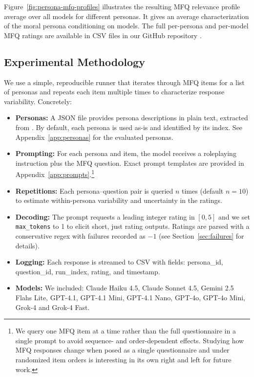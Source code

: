 \documentclass{article}
\begin{document}
Figure~\ref{fig:persona-mfq-profiles} illustrates the resulting MFQ relevance profile average over all models for different personas. It gives an average characterization of the moral persona conditioning on models. The full per-persona and per-model MFQ ratings are available in CSV files in our GitHub repository \cite{costa2025llmms}. 

\subsection{Experimental Methodology}
We use a simple, reproducible runner that iterates through MFQ items for a list of personas and repeats each item multiple times to characterize response variability. Concretely:
\begin{itemize}
  \item \textbf{Personas:} A JSON file provides persona descriptions in plain text, extracted from \citep{ge2025scalingsyntheticdatacreation}. By default, each persona is used as-is and identified by its index. See Appendix~\ref{app:personas} for the evaluated personas.
  \item \textbf{Prompting:} For each persona and item, the model receives a roleplaying instruction plus the MFQ question. Exact prompt templates are provided in Appendix~\ref{app:prompts}.\footnote{We query one MFQ item at a time rather than the full questionnaire in a single prompt to avoid sequence- and order-dependent effects. Studying how MFQ responses change when posed as a single questionnaire and under randomized item orders is interesting in its own right and left for future work.}
  \item \textbf{Repetitions:} Each persona--question pair is queried \(n\) times (default \(n=10\)) to estimate within-persona variability and uncertainty in the ratings.
  \item \textbf{Decoding:}  The prompt requests a leading integer rating in \([0,5]\) and we set \texttt{max\_tokens} to 1 to elicit short, just rating outputs. Ratings are parsed with a conservative regex with failures recorded as \(-1\) (see Section~\ref{sec:failures} for details).
  \item \textbf{Logging:} Each response is streamed to CSV with fields: persona\_id, question\_id, run\_index, rating, and timestamp.
  \item \textbf{Models:} We included: Claude Haiku 4.5, Claude Sonnet 4.5, Gemini 2.5 Flahs Lite, GPT-4.1, GPT-4.1 Mini, GPT-4.1 Nano, GPT-4o, GPT-4o Mini, Grok-4 and Grok-4 Fast.
\end{itemize}
\end{document}
